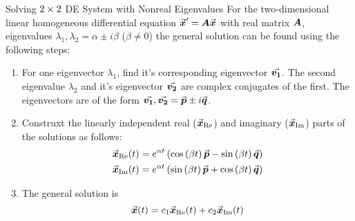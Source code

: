 \documentclass{beamer}
\newcommand{\xReal}{\vect{x}_{\text{Re}}}
\newcommand{\xImag}{\vect{x}_{\text{Im}}}
\begin{document}
\begin{frame}
\begin{block}{Solving $2\times 2$ DE System with Nonreal Eigenvalues}
For the two-dimensional linear homogeneous differential equation ${\vec{\boldsymbol{x}}}^\prime=\boldsymbol{A}{\vec{\boldsymbol{x}}}$ with real matrix $\boldsymbol{A}$, eigenvalues $\lambda_1,\lambda_2=\alpha\pm i\beta$ ($\beta\neq 0$) the general solution can be found using the following steps:
\onslide<+->
\begin{enumerate}[<+- | alert@+>]
\item For one eigenvector $\lambda_1$, find it's corresponding eigenvector ${\vec{\boldsymbol{v_1}}}$. The second eigenvalue $\lambda_2$ and it's eigenvector ${\vec{\boldsymbol{v_2}}}$ are complex conjugates of the first. The eigenvectors are of the form ${\vec{\boldsymbol{v_1}}},{\vec{\boldsymbol{v_2}}}={\vec{\boldsymbol{p}}}\pm i{\vec{\boldsymbol{q}}}$.
\item Construxt the linearly independent real ($\xReal$) and imaginary ($\xImag$) parts of the solutions as follows:
\begin{equation*}
\begin{aligned}
\xReal(t) &= e^{\alpha t}\left(\cos[\beta t]\vect{p}-\sin[\beta t]\vect{q} \right)\\
\xImag(t) &= e^{\alpha t}\left(\sin[\beta t]\vect{p}+\cos[\beta t]\vect{q} \right) \\
\end{aligned}
\end{equation*}
\item The general solution is
\begin{equation*}
\vect{x}(t)=c_1\xReal(t)+c_2\xImag(t)
\end{equation*}
\end{enumerate}
\end{block}
\end{frame}
\end{document}
